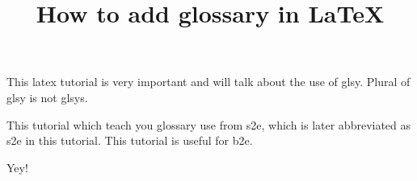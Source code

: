 \documentclass{article}
\title{How to add glossary in LaTeX}
\author{ }
\date{ }
\begin{document}
\maketitle

This \Gls{latex} tutorial is very important and will talk about the use of \gls{glsy}. 
Plural of \Gls{glsy} is not \Glspl{glsy}. 

This tutorial which teach you glossary use from \acrlong{s2e}, which is  later abbreviated as \acrshort{s2e}  in this tutorial. This tutorial is useful for \acrlong{b2e}.


Yey!

\clearpage

\printglossary[type=\acronymtype]
\end{document}
